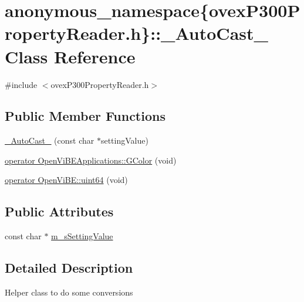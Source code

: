 \hypertarget{classanonymous__namespace_02ovexP300PropertyReader_8h_03_1_1__AutoCast__}{
\section{anonymous\_\-namespace\{ovexP300PropertyReader.h\}::\_\-AutoCast\_\- Class Reference}
\label{classanonymous__namespace_02ovexP300PropertyReader_8h_03_1_1__AutoCast__}
}


{\ttfamily \#include $<$ovexP300PropertyReader.h$>$}

\subsection*{Public Member Functions}
\begin{DoxyCompactItemize}
\item 
\hyperlink{classanonymous__namespace_02ovexP300PropertyReader_8h_03_1_1__AutoCast___a0b5123cdbe5c2040617dc464fc76c7aa}{\_\-AutoCast\_\-} (const char $\ast$settingValue)
\item 
\hyperlink{classanonymous__namespace_02ovexP300PropertyReader_8h_03_1_1__AutoCast___a2532d918e70d29c827f3c342b6ab66b7}{operator OpenViBEApplications::GColor} (void)
\item 
\hyperlink{classanonymous__namespace_02ovexP300PropertyReader_8h_03_1_1__AutoCast___aa1f351e789a2b0e68e0d5a7ab7ed5ba1}{operator OpenViBE::uint64} (void)
\end{DoxyCompactItemize}
\subsection*{Public Attributes}
\begin{DoxyCompactItemize}
\item 
const char $\ast$ \hyperlink{classanonymous__namespace_02ovexP300PropertyReader_8h_03_1_1__AutoCast___aebc953a8d5731fdfdb315cbaffc17e44}{m\_\-sSettingValue}
\end{DoxyCompactItemize}


\subsection{Detailed Description}
Helper class to do some conversions 

